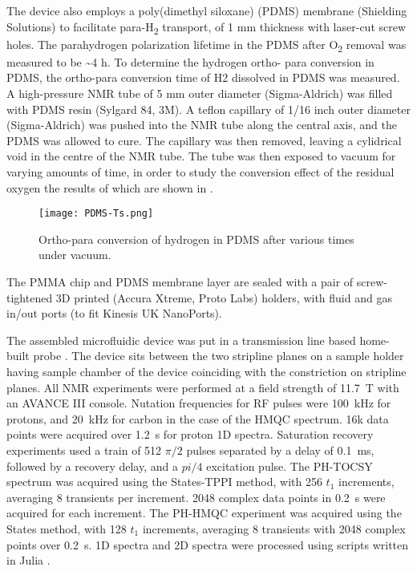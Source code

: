 The device also employs a poly(dimethyl siloxane) (PDMS) membrane
(Shielding Solutions) to facilitate para-H\textsubscript{2} transport,
of 1 mm thickness with laser-cut screw holes. The parahydrogen
polarization lifetime in the PDMS after O\textsubscript{2} removal was
measured to be \textasciitilde{}4 h. To determine the hydrogen ortho- para
conversion in PDMS, the ortho-para conversion time of H2 dissolved in PDMS
was measured. A high-pressure NMR tube of 5 mm outer diameter
(Sigma-Aldrich) was filled with PDMS resin (Sylgard 84, 3M). A teflon
capillary of 1/16 inch outer diameter (Sigma-Aldrich) was pushed
into the NMR tube along the central axis, and the PDMS was allowed to cure.
The capillary was then removed, leaving a cylidrical void in the centre of
the NMR tube. The tube was then exposed to vacuum for varying amounts of
time, in order to study the conversion effect of the residual oxygen the
results of which are shown in .

\begin{figure}
  \texttt{[image: PDMS-Ts.png]}
  \caption{Ortho-para conversion of hydrogen in PDMS after various times
  under vacuum.}
  \label{fig:ph2conv}
\end{figure}

The PMMA chip and PDMS membrane layer are sealed with a pair of
screw-tightened 3D printed (Accura Xtreme, Proto Labs) holders, with
fluid and gas in/out ports (to fit Kinesis UK NanoPorts).

The assembled microfluidic device was put in a transmission line based
home-built probe \cite{RN164}. The
device sits between the two stripline planes on a sample holder having
sample chamber of the device coinciding with the constriction on
stripline planes. All NMR experiments were performed at a field strength
of 11.7~T with an AVANCE III console. Nutation frequencies for RF pulses
were 100~kHz for protons, and 20~kHz for carbon in the case of the HMQC
spectrum. 16k data points were acquired over 1.2~s for proton 1D spectra.
Saturation recovery experiments used a train of 512 $\pi/2$ pulses
separated by a delay of 0.1~ms, followed by a recovery delay, and a $pi/4$
excitation pulse.
The PH-TOCSY spectrum was acquired using the States-TPPI method,
with 256 $t_1$ increments, averaging 8 transients per increment.
2048 complex data points in 0.2~s were acquired for each increment.
The PH-HMQC experiment was acquired using the States method, with
128 $t_1$ increments, averaging 8 transients with 2048 complex points
over 0.2~s. 1D spectra and
2D spectra were processed using scripts written in Julia \cite{Bezanson:2017gd}.

